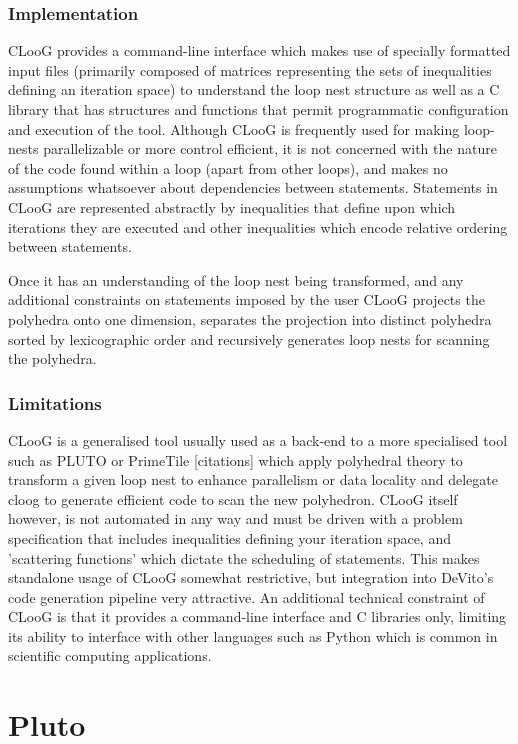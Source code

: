 \documentclass[a4paper,12pt,twoside]{report}
\begin{document}
\subsubsection{Implementation}
CLooG provides a command-line interface which makes use of specially formatted input files (primarily composed of matrices representing
the sets of inequalities defining an iteration space) to understand the loop nest structure as well as a C library that has structures and
functions that permit programmatic configuration and execution of the tool.
Although CLooG is frequently used for making loop-nests parallelizable or more control efficient, it is not concerned with the nature of the
code found within a loop (apart from other loops), and makes no assumptions whatsoever about dependencies between statements.
Statements in CLooG are represented abstractly by inequalities that define upon which iterations they are executed and other inequalities
which encode relative ordering between statements.

Once it has an understanding of the loop nest being transformed, and any additional constraints on statements imposed by the user
CLooG projects the polyhedra onto one dimension, separates the projection into distinct polyhedra sorted by lexicographic order and 
recursively generates loop nests for scanning the polyhedra.

\subsubsection{Limitations}
CLooG is a generalised tool usually used as a back-end to a more specialised tool such as PLUTO or PrimeTile [citations] which
apply polyhedral theory to transform a given loop nest to enhance parallelism or data locality and delegate cloog to generate
efficient code to scan the new polyhedron. CLooG itself however, is not automated in any way and must be driven with a problem
specification that includes inequalities defining your iteration space, and 'scattering functions' which dictate the scheduling
of statements. This makes standalone usage of CLooG somewhat restrictive, but integration into DeVito's code generation pipeline
very attractive. An additional technical constraint of CLooG is that it provides a command-line interface and C libraries only,
limiting its ability to interface with other languages such as Python which is common in scientific computing applications.
\section{Pluto}
\end{document}
